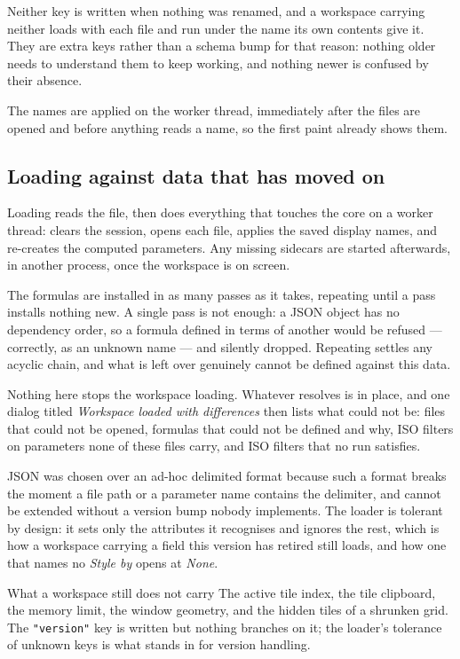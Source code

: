 \documentclass[11pt,a4paper,oneside]{report}
\newcommand{\code}[1]{\texttt{#1}}
\begin{document}
Neither key is written when nothing was renamed, and a workspace carrying
neither loads with each file and run under the name its own contents give it.
They are extra keys rather than a schema bump for that reason: nothing older
needs to understand them to keep working, and nothing newer is confused by
their absence.

The names are applied on the worker thread, immediately after the files are
opened and before anything reads a name, so the first paint already shows them.

\subsection{Loading against data that has moved on}

Loading reads the file, then does everything that touches the core on a worker
thread: clears the session, opens each file, applies the saved display names,
and re-creates the computed parameters. Any missing sidecars are started
afterwards, in another process, once the workspace is on screen.

The formulas are installed in as many passes as it takes, repeating until a
pass installs nothing new. A single pass is not enough: a JSON
object has no dependency order, so a formula defined in terms of another would be
refused --- correctly, as an unknown name --- and silently dropped. Repeating
settles any acyclic chain, and what is left over genuinely cannot be defined
against this data.

Nothing here stops the workspace loading. Whatever resolves is in place, and one
dialog titled \emph{Workspace loaded with differences} then lists what could not
be: files that could not be opened, formulas that could not be defined and why,
ISO filters on parameters none of these files carry, and ISO filters that no run
satisfies.

JSON was chosen over an ad-hoc delimited format because such a format breaks the
moment a file path or a parameter name contains the delimiter, and cannot be
extended without a version bump nobody implements. The loader is tolerant by
design: it sets only the attributes it recognises and ignores the rest, which
is how a workspace carrying a field this version has retired still loads, and
how one that names no \emph{Style by} opens at \emph{None}.

\begin{aoenote}{What a workspace still does not carry}
The active tile index, the tile clipboard, the memory limit, the window geometry,
and the hidden tiles of a shrunken grid. The \code{"version"} key is written but
nothing branches on it; the loader's tolerance of unknown keys is what stands in
for version handling.
\end{aoenote}
\end{document}
